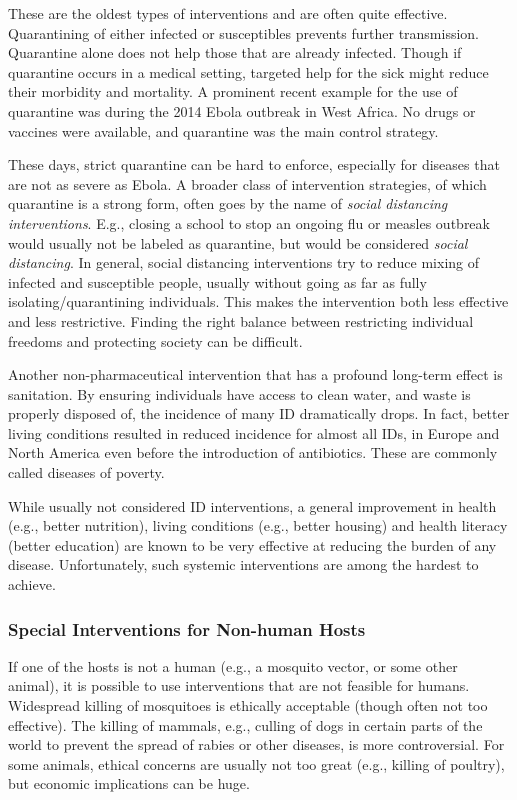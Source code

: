\documentclass[]{article}
\theoremstyle{definition}
\theoremstyle{definition}
\theoremstyle{definition}
\theoremstyle{remark}
\begin{document}
These are the oldest types of interventions and are often quite
effective. Quarantining of either infected or susceptibles prevents
further transmission. Quarantine alone does not help those that are
already infected. Though if quarantine occurs in a medical setting,
targeted help for the sick might reduce their morbidity and mortality. A
prominent recent example for the use of quarantine was during the 2014
Ebola outbreak in West Africa. No drugs or vaccines were available, and
quarantine was the main control strategy.

These days, strict quarantine can be hard to enforce, especially for
diseases that are not as severe as Ebola. A broader class of
intervention strategies, of which quarantine is a strong form, often
goes by the name of \emph{social distancing interventions}. E.g.,
closing a school to stop an ongoing flu or measles outbreak would
usually not be labeled as quarantine, but would be considered
\emph{social distancing}. In general, social distancing interventions
try to reduce mixing of infected and susceptible people, usually without
going as far as fully isolating/quarantining individuals. This makes the
intervention both less effective and less restrictive. Finding the right
balance between restricting individual freedoms and protecting society
can be difficult.

Another non-pharmaceutical intervention that has a profound long-term
effect is sanitation. By ensuring individuals have access to clean
water, and waste is properly disposed of, the incidence of many ID
dramatically drops. In fact, better living conditions resulted in
reduced incidence for almost all IDs, in Europe and North America even
before the introduction of antibiotics. These are commonly called
diseases of poverty.

While usually not considered ID interventions, a general improvement in
health (e.g., better nutrition), living conditions (e.g., better
housing) and health literacy (better education) are known to be very
effective at reducing the burden of any disease. Unfortunately, such
systemic interventions are among the hardest to achieve.

\subsubsection{Special Interventions for Non-human
Hosts}\label{special-interventions-for-non-human-hosts}

If one of the hosts is not a human (e.g., a mosquito vector, or some
other animal), it is possible to use interventions that are not feasible
for humans. Widespread killing of mosquitoes is ethically acceptable
(though often not too effective). The killing of mammals, e.g., culling
of dogs in certain parts of the world to prevent the spread of rabies or
other diseases, is more controversial. For some animals, ethical
concerns are usually not too great (e.g., killing of poultry), but
economic implications can be huge.
\end{document}
